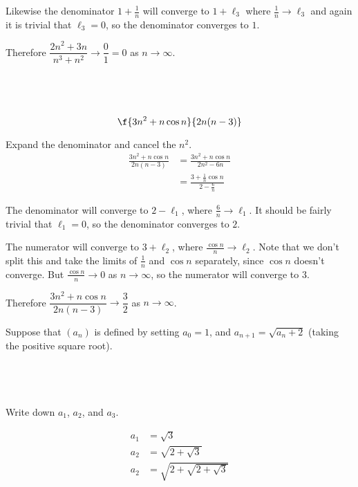 \documentclass[a4paper]{article}
\begin{document}
Likewise the denominator $1 + \frac1n$ will converge to $1 + \ell_3$ where $\frac1n \to \ell_3$ and again it is trivial that $\ell_3 = 0$, so the denominator converges to $1$.

Therefore $\dfrac{2n^2 + 3n}{n^3 + n^2} \to \dfrac01 = 0$ as $n \to \infty$.

\subsection{~} %

\begin{questionbody}
\[ \f{3n^2 + n\cos n}{2n (n-3)} \]
\end{questionbody}

Expand the denominator and cancel the $n^2$.
\begin{align*}
    \frac{3n^2 + n\cos n}{2n (n-3)} &= \frac{3n^2 + n\cos n}{2n^2 - 6n} \\[1ex]
                                    &= \frac{3 + \frac1n \cos n}{2 - \frac6n}
\end{align*}

The denominator will converge to $2 - \ell_1$, where $\frac6n \to \ell_1$. It should be fairly trivial that $\ell_1 = 0$, so the denominator converges to $2$.

The numerator will converge to $3 + \ell_2$, where $\frac{\cos n}{n} \to \ell_2$. Note that we don't split this and take the limits of $\frac1n$ and $\cos n$ separately, since $\cos n$ doesn't converge. But $\frac{\cos n}{n} \to 0$ as $n \to \infty$, so the numerator will converge to $3$.

Therefore $\dfrac{3n^2 + n\cos n}{2n (n-3)} \to \dfrac32$ as $n \to \infty$.


\renewcommand{\thesubsection}{Q\arabic{section}~(\roman{subsection})}


\begin{questionbody}
Suppose that $(a_n)$ is defined by setting $a_0 = 1$, and $a_{n + 1} = \sqrt{a_n + 2}$ (taking the positive square root).
\end{questionbody}

\subsection{~} %

\begin{questionbody}
Write down $a_1$, $a_2$, and $a_3$.
\end{questionbody}
%
\begin{align*}
    a_1 &= \sqrt3 \\[1ex]
    a_2 &= \sqrt{2 + \sqrt3} \\[1ex]
    a_2 &= \sqrt{2 + \sqrt{2 + \sqrt3}}
\end{align*}
\end{document}
